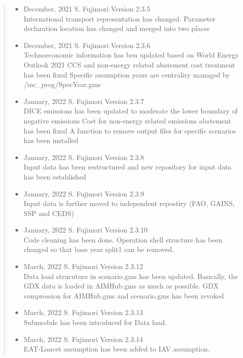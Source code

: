 \documentclass[10pt,a4paper,titlepage,dvipdfmx]{book}
\begin{document}
\begin{quote}
\begin{itemize}
  \item December, 2021 S. Fujimori Version 2.3.5 \\
      International transport representation has changed.
      Parameter declaration location has changed and merged into two places


  \item December, 2021 S. Fujimori Version 2.3.6 \\
      Technoeconomic information has ben updated based on World Energy Outlook 2021
      CCS and non-energy related abatement cost treatment has been fixed
      Specific assumption years are centraliry managed by /inc\_prog/SpecYear.gms

  \item January, 2022 S. Fujimori Version 2.3.7 \\
      DICE emissions has been updated to moderate the lower boundary of negative emissions
      Cost for non-energy related emissions abatement has been fixed
      A function to remove output files for specific scenarios has been installed
 
  \item January, 2022 S. Fujimori Version 2.3.8 \\
      Input data has been restructured and new repository for input data has been established

  \item January, 2022 S. Fujimori Version 2.3.9 \\
      Input data is further moved to independent repostiry (FAO, GAINS, SSP and CEDS)

  \item January, 2022 S. Fujimori Version 2.3.10 \\
      Code cleaning has been done.
      Operation shell structure has been changed so that base year split1 can be removed.

  \item March, 2022 S. Fujimori Version 2.3.12 \\
      Data load strucuture in scenario.gms has been updated. Basically, the GDX data is loaded in AIMHub.gms as much as possible.
      GDX compression for AIMHub.gms and scenario.gms has been revoked 

  \item March, 2022 S. Fujimori Version 2.3.13 \\
      Submodule has been introduced for Data load.

  \item March, 2022 S. Fujimori Version 2.3.14 \\
      EAT-Lancet assumption has been added to IAV assumption.


\end{itemize}
\end{quote}
\end{document}
